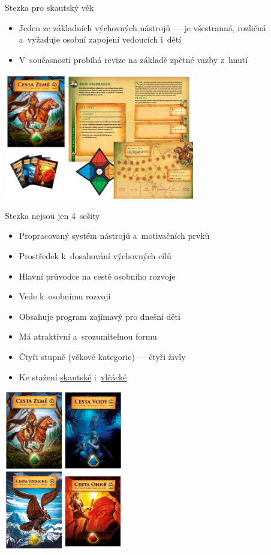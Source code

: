 \documentclass[compress, ucs, xelatex, xcolor=dvipsnames, print,
  hyperref={
    bookmarks=true,
    unicode=true,
    colorlinks=true,
    plainpages=false,
    pdfkeywords={Junak, Pedagogika, Skaut, Skauting, Vychovna metoda},
    linkcolor=Black,
    anchorcolor=Black,
    citecolor=OliveGreen,
    filecolor=OliveGreen,
    menucolor=Black,
    urlcolor=OliveGreen,
    pdftex}
  ]{beamer}
\begin{document}
\begin{frame}{Stezka pro skautský věk}
  \begin{itemize}
    \item Jeden ze základních výchovných nástrojů --- je všestranná, rozličná a~vyžaduje osobní zapojení vedoucích i~dětí
    \item V~současnosti probíhá revize na základě zpětné vazby z~hnutí
  \end{itemize}
  \begin{center}
    \includegraphics[height=5.5cm]{stezka.png}
  \end{center}
\end{frame}

\begin{frame}{Stezka nejsou jen 4~sešity}
  \begin{multicols}{2}
    \begin{itemize}
      \item Propracovaný systém nástrojů a~motivačních prvků
      \item Prostředek k~dosahování výchovných cílů
      \item Hlavní průvodce na cestě osobního rozvoje
      \item Vede k~osobnímu rozvoji
      \item Obsahuje program zajímavý pro dnešní děti
      \item Má atraktivní a~srozumitelnou formu
      \item Čtyři stupně (věkové kategorie) --- čtyři živly
      \item Ke stažení \href{https://krizovatka.skaut.cz/oddil/program/skautky-a-skauti/skauti-skautky-stezky}{skautské} i~\href{https://krizovatka.skaut.cz/oddil/program/svetlusky-a-vlcata}{vlčácké}
    \end{itemize}
    \columnbreak
    \includegraphics[height=7cm]{stezky.png}
  \end{multicols}
\end{frame}
\end{document}
